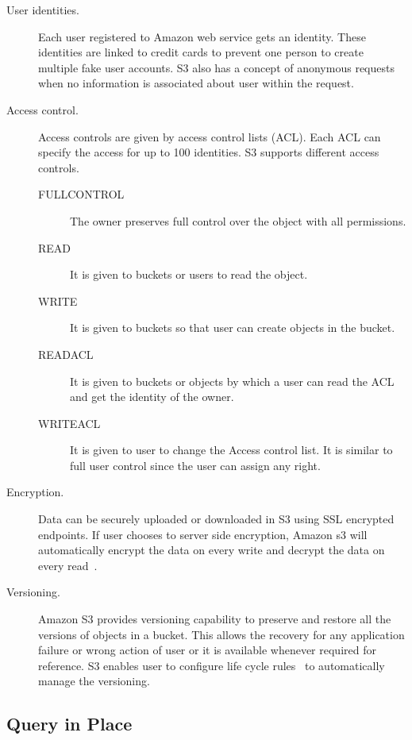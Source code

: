 \begin{description}

\item [User identities.] Each user registered to Amazon web service gets an
identity. These identities are linked to credit cards to prevent one person to
create multiple fake user accounts. S3 also has a concept of anonymous requests
when no information is associated about user within the request.

\item [Access control.]Access controls are given by access control lists (ACL).
Each ACL can specify the access for up to 100 identities. S3 supports different
access controls.

\begin{description}
\item [FULLCONTROL] The owner preserves full control over the object with all
permissions.
\item [READ] It is given to buckets or users to read the object.
\item [WRITE] It is given to buckets so that user can create objects in the
bucket.
\item [READACL] It is given to buckets or objects by which a user can read the
ACL and get the identity of the owner.
\item [WRITEACL] It is given to user to change the Access control list. It is
similar to full user control since the user can assign any right.
\end{description}

\item [Encryption.] Data can be securely uploaded or downloaded in S3 using SSL
encrypted endpoints. If user chooses to server side encryption, Amazon s3 will
automatically encrypt the data on every write and decrypt the data on every
read~\cite{hid-sp18-420-amazon-S3-data-encryption}.

\item [Versioning.] Amazon S3 provides versioning capability to preserve and
restore all the versions of objects in a bucket. This allows the recovery for
any application failure or wrong action of user or it is available whenever
required for reference. S3 enables user to configure life cycle
rules~\cite{hid-sp18-420-amazon-S3-lidecycle-rule} to automatically manage the
versioning.

\end{description}


\subsection{Query in Place} 

